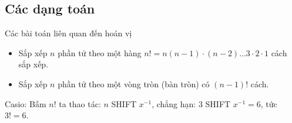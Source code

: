 \subsection{Các dạng toán}
\setcounter{dang}{0}
\begin{dang}{Các bài toán liên quan đến hoán vị}
	\begin{itemize}
		\item Sắp xếp $n$ phần tử theo một hàng $n!=n(n-1)\cdot(n-2)\ldots3\cdot2\cdot1$ cách sắp xếp.
		\item Sắp xếp $ n $ phần tử theo một vòng tròn (bàn tròn) có $ (n-1)! $ cách. 
	\end{itemize}
	\begin{note} Casio: Bấm $ n! $ ta thao tác: $ n $ SHIFT $ x^{-1} $, chẳng hạn: $ 3 $ SHIFT $ x^{-1}=6 $, tức $ 3!=6 $. 
	\end{note}
\end{dang}
